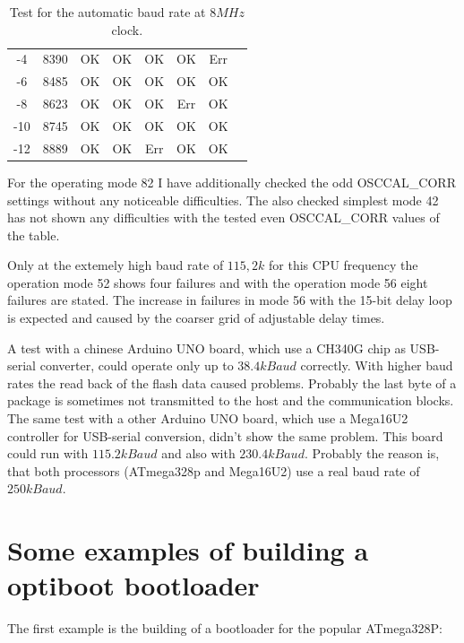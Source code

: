 \begin{table}[H]
\begin{center}
\begin{tabular}{| c | c || c | c | c || c |  c | c |}
    \hline
    -4     &  8390   &  OK       &   OK    &  OK     &  OK     &   Err \\
    -6     &  8485   &  OK       &   OK    &  OK     &  OK     &   OK  \\
    \hline
    -8     &  8623   &  OK       &   OK    &  OK     &  Err    &   OK  \\
    -10    &  8745   &  OK       &   OK    &  OK     &  OK     &   OK  \\
    -12    &  8889   &  OK       &   OK    &  Err    &  OK     &   OK  \\
    \hline
    \end{tabular}
  \end{center}
  \caption{Test for the automatic baud rate at \(8MHz\) clock.}
  \label{tab:AutoBaudTest8}
\end{table}

For the operating mode 82 I have additionally checked the odd OSCCAL\_CORR settings without
any noticeable difficulties. The also checked simplest mode 42 has not shown
any difficulties with the tested even OSCCAL\_CORR values of the table.

Only at the extemely high baud rate of \(115,2k\) for this CPU frequency the operation
mode 52 shows four failures and with the operation mode 56 eight failures are stated.
The increase in failures in mode 56 with the 15-bit delay loop is expected and caused by
the coarser grid of adjustable delay times.

A test with a chinese Arduino UNO board, which use a CH340G chip as USB-serial converter,
could operate only up to \(38.4kBaud\) correctly.
With higher baud rates the read back of the flash data caused problems.
Probably the last byte of a package is sometimes not transmitted to the host and
the communication blocks.
The same test with a other Arduino UNO board, which use a Mega16U2 controller
for USB-serial conversion, didn't show the same problem.
This board could run with \(115.2kBaud\) and also with \(230.4kBaud\). 
Probably the reason is, that both processors (ATmega328p and Mega16U2)
use a real baud rate of \(250kBaud\).


\section{Some examples of building a optiboot bootloader}

The first example is the building of a bootloader for the popular ATmega328P:

